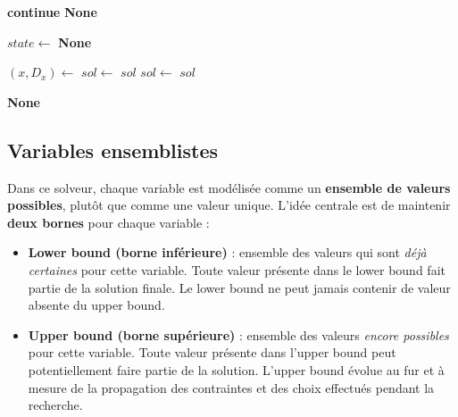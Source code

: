 \documentclass{article}
\begin{document}
\begin{algorithm}[H]
\caption{Solveur CSP ensembliste}
\label{alg:set_solver}
\begin{algorithmic}[1]

            \State \textbf{continue}
        \Else
            \State \Return {}
        \EndIf
    \EndWhile
\EndFunction
\newline
\newline
{}
        \State \Return \textbf{None}
    \EndIf

    \State $state \gets$ 
        \State {}
        \State \Return \textbf{None}
    \EndIf

        \State \Return {}
    \EndIf

    \State $(x, D_x) \gets$ 
        \State $sol \gets$ 
         \State \Return $sol$ \EndIf
        \State $sol \gets$ 
         \State \Return $sol$ \EndIf
    \EndFor

    \State {}
    \State \Return \textbf{None}

\EndFunction

\end{algorithmic}
\end{algorithm}




\subsection{Variables ensemblistes}
Dans ce solveur, chaque variable est modélisée comme un \textbf{ensemble de valeurs possibles}, plutôt que comme une valeur unique. 
L'idée centrale est de maintenir \textbf{deux bornes} pour chaque variable :

\begin{itemize}
    \item \textbf{Lower bound (borne inférieure)} : ensemble des valeurs qui sont \emph{déjà certaines} pour cette variable. 
    Toute valeur présente dans le lower bound fait partie de la solution finale. 
    Le lower bound ne peut jamais contenir de valeur absente du upper bound.

    \item \textbf{Upper bound (borne supérieure)} : ensemble des valeurs \emph{encore possibles} pour cette variable. 
    Toute valeur présente dans l'upper bound peut potentiellement faire partie de la solution. 
    L'upper bound évolue au fur et à mesure de la propagation des contraintes et des choix effectués pendant la recherche.
\end{itemize}
\end{document}
